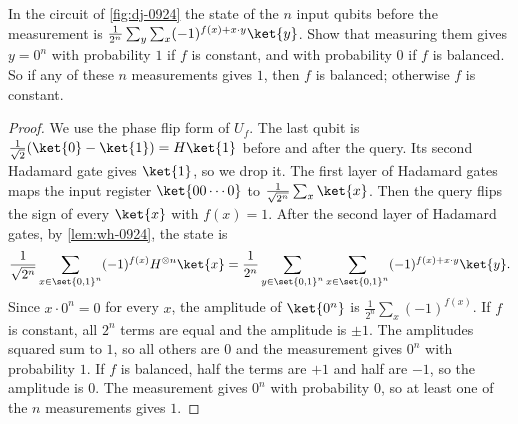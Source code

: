 \FloatBarrier
{} %
\begin{exercisebox}
\begin{exercise}\label{ex:dj-0924}\label{thm:dj-0924}
    In the circuit of \cref{fig:dj-0924} the state of the $n$ input qubits before the measurement
    is $\frac{1}{2^n} \sum_{y} \sum_{x} (-1)^{f(x) + x \cdot y} \ket{y}$. Show that measuring them
    gives $y = 0^n$ with probability $1$ if $f$ is constant, and with probability $0$ if $f$ is
    balanced. So if any of these $n$ measurements gives $1$, then $f$ is balanced; otherwise $f$ is
    constant.
\end{exercise}
\tcblower
\begin{proof}
    We use the phase flip form of $U_f$. The last qubit is
    $\frac{1}{\sqrt{2}}(\ket{0} - \ket{1}) = H\ket{1}$ before and after the query. Its second
    Hadamard gate gives $\ket{1}$, so we drop it. The first layer of Hadamard gates maps the input
    register $\ket{00 \cdots 0}$ to $\frac{1}{\sqrt{2^n}} \sum_{x} \ket{x}$. Then the query flips the
    sign of every $\ket{x}$ with $f(x) = 1$. After the second layer of Hadamard gates, by \cref{lem:wh-0924},
    the state is
    \[\frac{1}{\sqrt{2^n}} \sum_{x \in \set{0,1}^n} (-1)^{f(x)} H^{\otimes n} \ket{x}
        = \frac{1}{2^n} \sum_{y \in \set{0,1}^n} \sum_{x \in \set{0,1}^n} (-1)^{f(x) + x \cdot y} \ket{y}.\]
    Since $x \cdot 0^n = 0$ for every $x$, the amplitude of $\ket{0^n}$ is
    $\frac{1}{2^n} \sum_{x} (-1)^{f(x)}$. If $f$ is constant, all $2^n$ terms are equal and the
    amplitude is $\pm 1$. The amplitudes squared sum to $1$, so all others are $0$ and the measurement
    gives $0^n$ with probability $1$. If $f$ is balanced, half the terms are $+1$ and half are $-1$, so
    the amplitude is $0$. The measurement gives $0^n$ with probability $0$, so at least one of the
    $n$ measurements gives $1$.
\end{proof}
\end{exercisebox}
